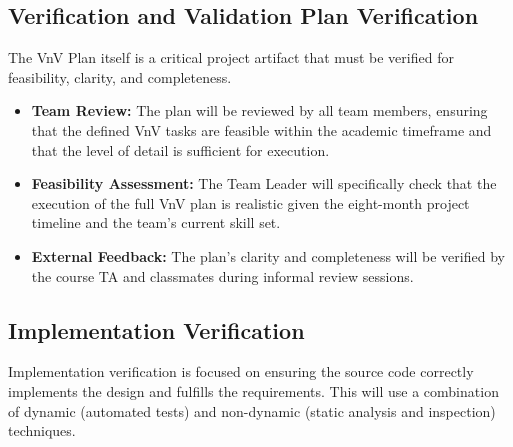 \documentclass[12pt, titlepage]{article}
\begin{document}
\subsection{Verification and Validation Plan Verification}





The VnV Plan itself is a critical project artifact that must be verified for feasibility, clarity, and completeness.

\begin{itemize}
    \item \textbf{Team Review:} The plan will be reviewed by all team members, ensuring that the defined VnV tasks are feasible within the academic timeframe and that the level of detail is sufficient for execution.
    \item \textbf{Feasibility Assessment:} The Team Leader will specifically check that the execution of the full VnV plan is realistic given the eight-month project timeline and the team’s current skill set.
    \item \textbf{External Feedback:} The plan's clarity and completeness will be verified by the course TA and classmates during informal review sessions.
\end{itemize}


\subsection{Implementation Verification}




Implementation verification is focused on ensuring the source code correctly implements the design and fulfills the requirements.
This will use a combination of dynamic (automated tests) and non-dynamic (static analysis and inspection) techniques.
\end{document}
